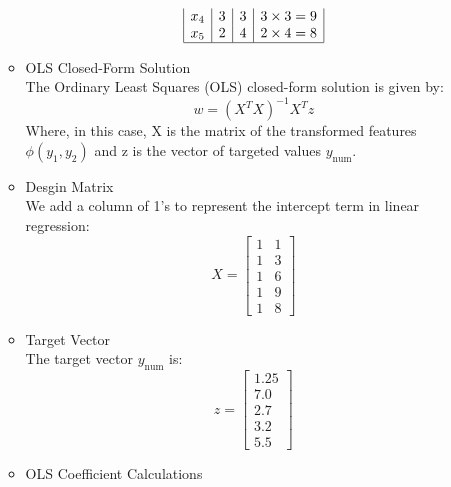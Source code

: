 \documentclass[12pt]{article}
\begin{document}
\begin{enumerate}[leftmargin=\labelsep, label=\textbf{\arabic*.)}]
\begin{itemize}
\begin{minipage}{1\textwidth}
\begin{center}
\[\begin{array}{|c|c|c|c|c}
                                    x_4 & 3   & 3   & 3 \times 3 = 9 \\
                                    x_5 & 2   & 4   & 2 \times 4 = 8 \\
                                    \hline
                                \end{array}\]
                        \end{center}
                    \end{minipage}
                    \vspace{0.5em}
              \item OLS Closed-Form Solution \\
                    \vspace{0.5em}
                    The Ordinary Least Squares (OLS) closed-form solution is given by:
                    \[
                        w = ({X}^T {X})^{-1} {X}^T z
                    \]
                    Where, in this case, X is the matrix of the transformed features $\phi(y_1, y_2)$ and z is the vector of targeted values $y_{\text{num}}$.
                    \vspace{0.5em}
              \item Desgin Matrix \\
                    We add a column of 1's to represent the intercept term in linear regression:
                    \[
                        X = \begin{bmatrix} 1 & 1 \\ 1 & 3 \\ 1 & 6 \\ 1 & 9 \\ 1 & 8 \end{bmatrix}
                    \]
              \item Target Vector \\
                    The target vector $y_{\text{num}}$ is:
                    \[
                        z = \begin{bmatrix} 1.25 \\ 7.0 \\ 2.7 \\ 3.2 \\ 5.5 \end{bmatrix}
                    \]
              \item OLS Coefficient Calculations \\
                    \vspace{0.5em}
                    \begin{minipage}{1\textwidth}

\end{minipage}
\end{itemize}
\end{enumerate}
\end{document}
